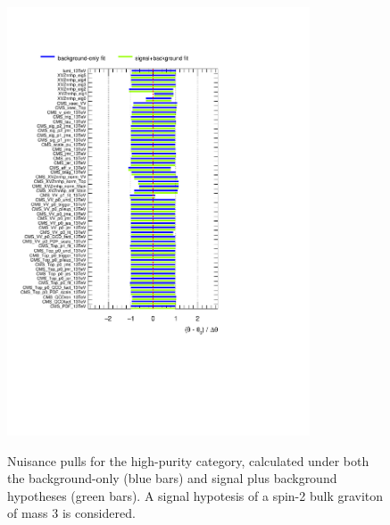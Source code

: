 \begin{figure}[!h]
   \caption{Nuisance pulls for the high-purity category, calculated under both the background-only (blue bars) and signal plus background hypotheses (green bars). A signal hypotesis of a spin-2 bulk graviton of mass 3 \TeV is considered.}
 \begin{center}
   \includegraphics[width=0.8\textwidth]{pulls_VZ_data_1fb/pulls_XZZInv_hp3000.pdf}
   \label{fig:pulls_hp}
 \end{center}
\end{figure}


